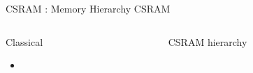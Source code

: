 \begin{Frame}{CSRAM : Memory Hierarchy CSRAM}
  \begin{columns}[t]
	\begin{column}{\BW}
      \begin{block}{Classical}
        \begin{itemize}
        \item
        \end{itemize}
        
      \end{block}
      
	\end{column}
	\begin{column}{\BW}
      \begin{block}{CSRAM hierarchy}
      \end{block}
	\end{column}
  \end{columns}
\end{Frame}

